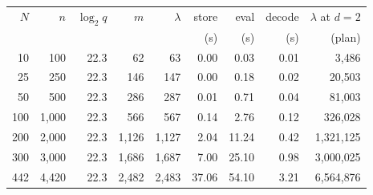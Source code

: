 \begin{tabular}{rrrrrrrrr}
\toprule
$N$ & $n$ & $\log_2 q$ & $m$ & $\lambda$ & store & eval & decode & $\lambda$ at $d{=}2$ \\
& & & & & (s) & (s) & (s) & (plan) \\
\midrule
10 & 100 & 22.3 & 62 & 63 & 0.00 & 0.03 & 0.01 & 3{,}486 \\
25 & 250 & 22.3 & 146 & 147 & 0.00 & 0.18 & 0.02 & 20{,}503 \\
50 & 500 & 22.3 & 286 & 287 & 0.01 & 0.71 & 0.04 & 81{,}003 \\
100 & 1{,}000 & 22.3 & 566 & 567 & 0.14 & 2.76 & 0.12 & 326{,}028 \\
200 & 2{,}000 & 22.3 & 1{,}126 & 1{,}127 & 2.04 & 11.24 & 0.42 & 1{,}321{,}125 \\
300 & 3{,}000 & 22.3 & 1{,}686 & 1{,}687 & 7.00 & 25.10 & 0.98 & 3{,}000{,}025 \\
442 & 4{,}420 & 22.3 & 2{,}482 & 2{,}483 & 37.06 & 54.10 & 3.21 & 6{,}564{,}876 \\
\bottomrule
\end{tabular}
